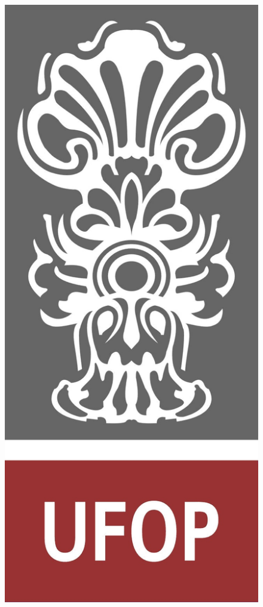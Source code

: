 \documentclass[portugues, brazil, a4paper,12pt]{article}
\begin{document}
\begin{titlepage}

  \vfill

	\begin{figure}[H]
	\centering
		\includegraphics[scale=0.15]{img/logo-ufop.jpg}
	\end{figure}


\end{titlepage}
\end{document}
